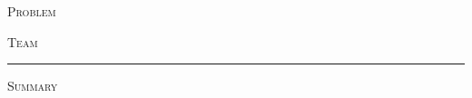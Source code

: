 \begin{titlepage}
\thispagestyle{empty}
\vspace*{0.6cm}
\noindent
\begin{minipage}[t]{0.45\textwidth}
  \raggedright
  {\scshape Problem}\\[0.35em]{\LARGE\bfseries\problemltr}
\end{minipage}\hfill
\begin{minipage}[t]{0.45\textwidth}
  \raggedleft
  {\scshape Team}\\[0.35em]{\LARGE\bfseries\teamnum}
\end{minipage}\par

\vspace{1.1em}
\noindent\rule{\textwidth}{0.6pt}\par
\vspace{1.7em}

{\centering
  {\LARGE\bfseries{}\papertitle\par}
  \vspace{1.5em}
  {\large\scshape Summary}\par
}
\vspace{0.9em}


\end{titlepage}
